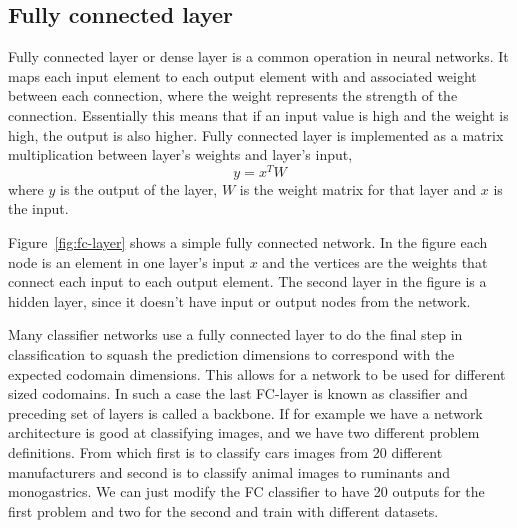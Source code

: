 \documentclass[12pt,a4paper,english
]{tunithesis}
\begin{document}
\subsection{Fully connected layer}
Fully connected layer or dense layer is a common operation in neural networks. It maps each input element to each output element with and associated weight between each connection, where the weight represents the strength of the connection. Essentially this means that if an input value is high and the weight is high, the output is also higher.
Fully connected layer is implemented as a matrix multiplication between layer's weights and layer's input,
\begin{equation}
y = x^{T} W
\end{equation}
where $y$ is the output of the layer, $W$ is the weight matrix for that layer and $x$ is the input.

Figure~\ref{fig:fc-layer} shows a simple fully connected network. In the figure each node is an element in one layer's input $x$ and the vertices are the weights that connect each input to each output element. The second layer in the figure is a hidden layer, since it doesn't have input or output nodes from the network.

Many classifier networks use a fully connected layer to do the final step in classification to squash the prediction dimensions to correspond with the expected codomain dimensions. This allows for a network to be used for different sized codomains. In such a case the last FC-layer is known as classifier and preceding set of layers is called a backbone. If for example we have a network architecture is good at classifying images, and we have two different problem definitions. From which first is to classify cars images from 20 different manufacturers and second is to classify animal images to ruminants and monogastrics. We can just modify the FC classifier to have 20 outputs for the first problem and two for the second and train with different datasets.
\end{document}
